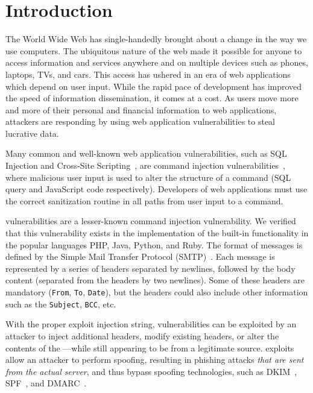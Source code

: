 \section{Introduction}\label{sec:Introduction}

The World Wide Web has single-handedly brought about a change in the way we use computers. The ubiquitous nature of the web made it possible for anyone to access information and services anywhere and on multiple devices such as phones, laptops, TVs, and cars. This access has ushered in an era of web applications which depend on user input. 
While the rapid pace of development has improved the speed of
information dissemination, it comes at a cost. As users move more and
more of their personal and financial information to web applications,
attackers are responding by using web application vulnerabilities to steal lucrative data.

Many common and well-known web application vulnerabilities, such as SQL Injection and Cross-Site Scripting~\cite{OWASPT10}, are command injection vulnerabilities~\cite{commandinjection}, where malicious user input is used to alter the structure of a command (SQL query and JavaScript code respectively). Developers of web applications must use the correct sanitization routine in all paths from user input to a command. 

\ehi vulnerabilities are a lesser-known command injection vulnerability. We verified that this vulnerability exists in the implementation of the built-in \email functionality in the popular languages PHP, Java, Python, and Ruby. The format of \email messages is defined by the Simple Mail Transfer Protocol (SMTP)~\cite{rfc5322}. Each \email message is represented by a series of headers separated by newlines, followed by the body content (separated from the headers by two newlines). Some of these headers are mandatory (\texttt{From}, \texttt{To}, \texttt{Date}), but the headers could also include other information such as the \texttt{Subject}, \texttt{BCC}, etc.

With the proper exploit injection string, \ehi vulnerabilities can be exploited by an attacker to inject additional headers, modify existing headers, or alter the contents of the \email---while still appearing to be from a legitimate source. \ehi exploits allow an attacker to perform \email spoofing, resulting in phishing attacks \emph{that are sent from the actual \email server}, and thus bypass \email spoofing technologies, such as DKIM~\cite{allman2007domainkeys}, SPF~\cite{schlitt2006sender}, and DMARC~\cite{kucherawy2015domain}.

